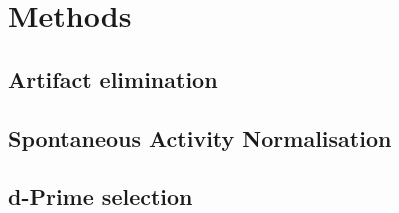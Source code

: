 \section{Methods}

\FloatBarrier
\subsection{Artifact elimination}
\label{sec:ma}

\subsection{Spontaneous Activity Normalisation}
\label{sec:}

\subsection{d-Prime selection}
\label{sec:}
